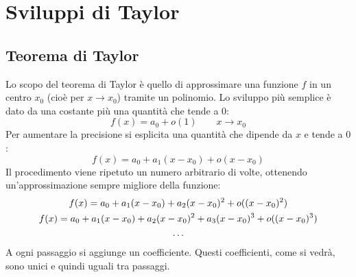 %
%
%
%


\section{Sviluppi di Taylor}

\subsection{Teorema di Taylor}
Lo scopo del teorema di Taylor è quello di approssimare una funzione $f$ in un centro $x_0$ (cioè per $x\to x_0$) tramite un polinomio. Lo sviluppo più semplice è dato da una costante più una quantità che tende a $0$:
\begin{equation}
	\label{taylor0}
	f(x)=a_0+o(1)\qquad x\to x_0
\end{equation}
Per aumentare la precisione si esplicita una quantità che dipende da $x$ e tende a $0$:
\begin{equation}
	\label{taylor1}
	f(x)=a_0+a_1(x-x_0)+o(x-x_0)
\end{equation}
Il procedimento viene ripetuto un numero arbitrario di volte, ottenendo un'approssimazione sempre migliore della funzione:
\begin{gather}
	\label{taylor2}
	f(x)=a_0+a_1(x-x_0)+a_2(x-x_0)^2+o((x-x_0)^2)\\
	\label{taylor3}
	f(x)=a_0+a_1(x-x_0)+a_2(x-x_0)^2+a_3(x-x_0)^3+o((x-x_0)^3)\\
	\dots\notag
\end{gather}
A ogni passaggio si aggiunge un coefficiente. Questi coefficienti, come si vedrà, sono unici e quindi uguali tra passaggi.

